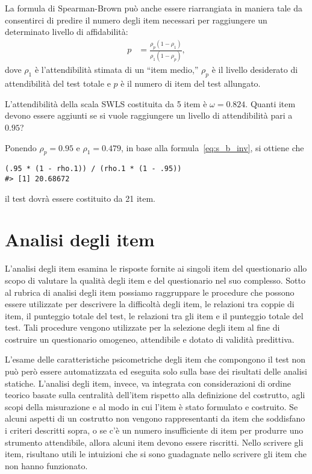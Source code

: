 La formula di Spearman-Brown può anche essere riarrangiata in maniera tale da consentirci di predire il numero degli item necessari per raggiungere un determinato livello di affidabilità:
\begin{align}
p &=  \frac{\rho_p (1-\rho_1)}{\rho_1(1-\rho_p)}, 
\label{eq:s_b_inv}
\end{align}
dove $\rho_1$ è l'attendibilità stimata di un ``item medio,'' $\rho_p$
è il livello desiderato di attendibilità del test totale e $p$ è il
numero  di item del test allungato.

\begin{exmp}
L'attendibilità della scala SWLS costituita da 5 item è  $\omega = 0.824$. Quanti item devono essere aggiunti se si vuole raggiungere un livello di attendibilità pari a $0.95$? 

Ponendo  $\rho_p = 0.95$ e $\rho_1= 0.479$, in base alla formula~\ref{eq:s_b_inv}, si ottiene che
\begin{lstlisting}
(.95 * (1 - rho.1)) / (rho.1 * (1 - .95))
#> [1] 20.68672
\end{lstlisting}
il test dovrà essere costituito da 21 item.
\end{exmp}




\section{Analisi degli item}

L'analisi degli item esamina le risposte fornite ai singoli item del
questionario allo scopo di valutare la qualità degli item e del
questionario nel suo complesso.  Sotto al rubrica di
analisi degli item possiamo raggruppare le procedure che possono essere utilizzate
per descrivere la difficoltà degli item, le relazioni tra
coppie di item, il punteggio totale del test, le relazioni tra gli item e il punteggio totale
del test. Tali procedure vengono utilizzate per la selezione degli
item al fine di costruire un questionario omogeneo, attendibile e dotato
di validità predittiva.

L'esame delle caratteristiche psicometriche degli item che compongono il test non può però essere automatizzata ed eseguita solo sulla base dei risultati delle analisi statiche. L'analisi degli item, invece, va integrata con considerazioni di ordine teorico basate sulla centralità dell'item rispetto alla definizione del costrutto, agli scopi della misurazione e al modo in cui l'item è stato formulato e costruito.
Se alcuni aspetti di un costrutto non vengono rappresentanti da item che soddisfano i criteri descritti sopra, o se c'è un numero insufficiente di item per produrre uno strumento attendibile, allora alcuni item devono essere riscritti. Nello scrivere gli item, risultano utili le intuizioni che si sono guadagnate nello scrivere gli item che non hanno funzionato. 



